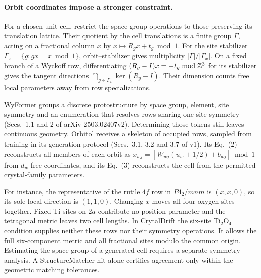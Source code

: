 \paragraph{Orbit coordinates impose a stronger constraint.}
For a chosen unit cell, restrict the space-group operations to those preserving its translation lattice. Their quotient by the cell translations is a finite group $\Gamma$, acting on a fractional column $x$ by $x\mapsto R_gx+t_g\bmod1$. For the site stabilizer $\Gamma_x=\{g:g x=x\bmod1\}$, orbit--stabilizer gives multiplicity $|\Gamma|/|\Gamma_x|$. On a fixed branch of a Wyckoff row, differentiating $(R_g-I)x=-t_g\bmod\mathbb Z^3$ for its stabilizer gives the tangent directions $\bigcap_{g\in\Gamma_x}\ker(R_g-I)$. Their dimension counts free local parameters away from row specializations.

WyFormer groups a discrete protostructure by space group, element, site symmetry and an enumeration that resolves rows sharing one site symmetry \cite{wyformer} (Secs.~1.1 and 2 of arXiv 2503.02407v2). Determining those tokens still leaves continuous geometry. Orbitol \cite{orbitol} receives a skeleton of occupied rows, sampled from training in its generation protocol (Secs.~3.1, 3.2 and 3.7 of v1). Its Eq.~(2) reconstructs all members of each orbit as $x_{wj}=[W_{wj}(u_w+1/2)+b_{wj}]\bmod1$ from $d_w$ free coordinates, and its Eq.~(3) reconstructs the cell from the permitted crystal-family parameters.

For instance, the representative of the rutile $4f$ row in $P4_2/mnm$ is $(x,x,0)$, so its sole local direction is $(1,1,0)$. Changing $x$ moves all four oxygen sites together. Fixed Ti sites on $2a$ contribute no position parameter and the tetragonal metric leaves two cell lengths. In CrytalDrift the six-site $\mathrm{Ti}_2\mathrm O_4$ condition supplies neither these rows nor their symmetry operations. It allows the full six-component metric and all fractional sites modulo the common origin. Estimating the space group of a generated cell requires a separate symmetry analysis. A StructureMatcher hit alone certifies agreement only within the geometric matching tolerances.

\newpage
